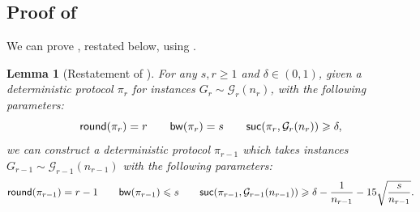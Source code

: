 \documentclass[11pt]{article}
\newtheorem*{lemma*}{Lemma}
\theoremstyle{definition}
\renewcommand{\leq}{\leqslant}
\renewcommand{\geq}{\geqslant}
\newcommand{\prot}{\ensuremath{\pi}}
\newcommand{\suc}{\ensuremath{\textnormal{\textsf{suc}}}}
\newcommand{\round}{\ensuremath{\textnormal{\textsf{round}}}}
\newcommand{\bwidth}{\ensuremath{\textnormal{\textsf{bw}}}}
\newcommand{\cG}{\ensuremath{\mathcal{G}}}
\begin{document}
\subsection{Proof of }\label{subsec:proof-round-elim}
We can prove , restated below, using .

\begin{lemma*}[Restatement of ]
	For any $s,r \geq 1$ and $\delta \in (0,1)$, 
	given a deterministic protocol $\prot_r$ for instances $G_r \sim \cG_r(n_r)$, with the following parameters:
	\begin{equation*}
		\round(\prot_r) = r \qquad \bwidth(\prot_r) = s \qquad \suc(\prot_r, \cG_r(n_r))\geq \delta, 
	\end{equation*}
	we can construct a deterministic protocol $\prot_{r-1}$ which takes instances  $G_{r-1} \sim \cG_{r-1}(n_{r-1})$ with the following parameters:
	\begin{equation*}
		\round(\prot_{r-1}) = r-1 \qquad \bwidth(\prot_{r-1}) \leq s \qquad \suc(\prot_{r-1}, \cG_{r-1}(n_{r-1}))\geq \delta - \frac1{n_{r-1}} - 15 \sqrt{\frac{s}{n_{r-1}}}.
	\end{equation*}
\end{lemma*}
\end{document}
